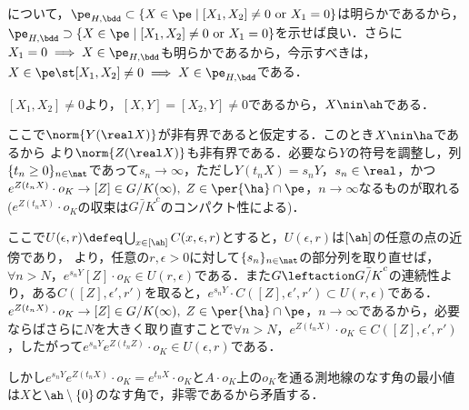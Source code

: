 \begin{pfwn}{}

   について，$\pe_{H,\bdd}\subset \{X\in \pe\mid [X_1,X_2] \neq 0\text{ or } X_1 =0 \}$は明らかであるから，\\
  $\pe_{H,\bdd}\supset \{X\in \pe\mid [X_1,X_2] \neq 0\text{ or } X_1 =0 \}$を示せば良い．さらに$X_1 = 0\implies X\in \pe_{H,\bdd} $も明らかであるから，今示すべきは，$X\in \pe \st [X_1, X_2] \neq 0\implies X\in \pe_{H,\bdd} $である．

  $[X_1, X_2]\neq 0$より，$ [X, Y] = [X_2, Y]\neq 0 $であるから，$X\nin \ah $である．

  ここで$\norm{Y(\real X)} $が非有界であると仮定する．このとき$X\nin \ha$であるから \cite[Lemma~5.4]{kobayashi97} より$\norm{Z(\real X)} $も非有界である．必要なら$Y$の符号を調整し，列$\{t_n\geq 0\}_{n\in\nat} $であって$s_n\to \infty$，ただし$Y(t_nX) = s_{n}Y $，$s_{n}\in \real $，かつ$e^{Z(t_nX)}\cdot o_K\to [Z]\in G/K(\infty) ,\; Z\in \per{\ha}\cap \pe $，$n\to \infty$なるものが取れる ($e^{Z(t_nX)}\cdot o_K $の収束は$\bar{G/K}^{c} $のコンパクト性による)．

  ここで$U(\epsilon, r)\defeq \bigcup_{x\in [\ah]} C(x,\epsilon,r) $とすると，$U(\epsilon, r) $は$[\ah]$の任意の点の近傍であり， より，任意の$r, \epsilon > 0$に対して$\{s_n\}_{n\in\nat} $の部分列を取り直せば，$\forall n> N$，$e^{s_nY}[Z] \cdot o_K\in U(r,\epsilon) $である．また$G\leftaction \bar{G/K}^{c}  $の連続性より，ある$C([Z],\epsilon',  r'  ) $を取ると，$e^{s_nY}\cdot C([Z],\epsilon',  r'  )\subset U(r,\epsilon)  $である．$e^{Z(t_nX)}\cdot o_K\to [Z]\in G/K(\infty) ,\; Z\in \per{\ha}\cap \pe $，$n\to \infty$であるから，必要ならばさらに$N$を大きく取り直すことで$\forall n > N$，$e^{Z(t_nX)}\cdot o_K\in C([Z],\epsilon',  r'  )$，したがって$e^{s_n Y}e^{Z(t_n Z)}\cdot o_K\in U(\epsilon, r) $である．
  
  しかし$e^{s_n Y}e^{Z(t_n X)}\cdot o_K= e^{t_n X}\cdot o_K $と$A\cdot o_K$上の$o_K$を通る測地線のなす角の最小値は$X$と$\ah\setminus\{0\} $のなす角で，非零であるから矛盾する．
  
\end{pfwn}

